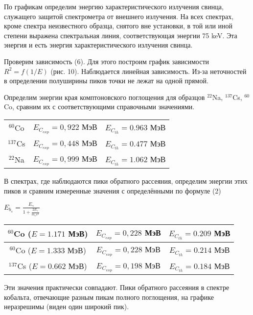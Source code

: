 По графикам определим энергию характеристического излучения свинца, служащего
защитой спектрометра от внешнего излучения. На всех спектрах, кроме спектра
неизвестного образца, снятого вне установки, в той или иной степени выражена
спектральная линия, соответствующая энергии 75 keV. Эта энергия и есть энергия
характеристического излучения свинца.

Проверим зависимость (6). Для этого построим график зависимости $R^2 = f(1/E)$
(рис. 10). Наблюдается линейная зависимость. Из-за неточностей в определении
полуширины пиков точки не лежат на одной прямой.

Определим энергии края комптоновского поглощения для образцов $^{22}$Na,
$^{137}$Cs, $^{60}$Co, сравним их с соответствующими справочными значениями.
\begin{center}
\begin{table}
\begin{tabular}{| c | c | c |}

  ${}^{60}$Co & $E_{C_{exp}} = 0,922$ МэВ & $E_{C_{th}} = 0.963$ МэВ \\
  ${}^{137}$Cs & $E_{C_{exp}} =0,448$ МэВ & $E_{C_{th}} = 0.477$ МэВ \\
  ${}^{22}$Na & $E_{C_{exp}} =0,999$ МэВ & $E_{C_{th}} = 1.062$ МэВ \\
\end{tabular}
\end{table}
\end{center}

В спектрах, где наблюдаются пики обратного рассеяния, определим энергии этих
пиков и сравним измеренные значения с определёнными по формуле (2)
\begin{center}
  $E_{b_s} = \frac{E_{\gamma}}{1 + \frac{2E_{\gamma}}{m_e c^2}}$
\end{center}

\begin{center}
\begin{table}
\begin{tabular}{| c | c | c |}
  \hline
  ${}^{60}$Co ($E = 1.171$ МэВ) & $E_{C_{exp}} = 0,228$ МэВ & $E_{C_{th}} =
  0.209$ МэВ \\
  \hline
  ${}^{60}$Co ($E = 1.333$ МэВ)& $E_{C_{exp}} = 0,228$ МэВ & $E_{C_{th}} =
  0.214$ МэВ \\
  \hline
  ${}^{137}$Cs ($E = 0.662$ МэВ)& $E_{C_{exp}} =0,198$ МэВ & $E_{C_{th}} =
  0.184$ МэВ \\
  \hline
\end{tabular}
\end{table}
\end{center}

Эти значения практически совпадают. Пики обратного рассеяния в спектре кобальта,
отвечающие разным пикам полного поглощения, на графике неразрешимы (виден один
широкий пик).
